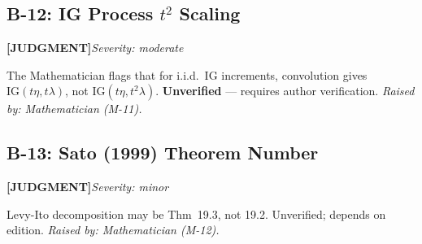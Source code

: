 \documentclass[11pt,a4paper]{article}
\newcommand{\judgmentlabel}{\textbf{\textcolor{judgmentorange}{[JUDGMENT]}}}
\begin{document}
\subsection{B-12: IG Process $t^2$ Scaling}
\judgmentlabel\quad\textit{Severity: moderate}

The Mathematician flags that for i.i.d.\ IG increments, convolution gives $\mathrm{IG}(t\eta,t\lambda)$, not $\mathrm{IG}(t\eta,t^2\lambda)$. \textbf{Unverified} --- requires author verification. \textit{Raised by: Mathematician (M-11).}

\subsection{B-13: Sato (1999) Theorem Number}
\judgmentlabel\quad\textit{Severity: minor}

Levy-Ito decomposition may be Thm~19.3, not 19.2. Unverified; depends on edition. \textit{Raised by: Mathematician (M-12).}
\end{document}
